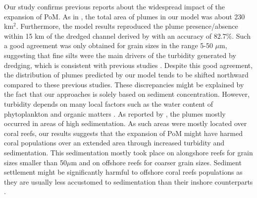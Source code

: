 \documentclass[preprint,12pt,authoryear]{elsarticle}
\begin{document}
Our study confirms previous reports about the widespread impact of the expansion of PoM. As in \cite{barnes2015sediment}, the total area of plumes in our model was about 230 km$^2$. Furthermore, the model results reproduced the plume presence/absence within 15 km of the dredged channel derived by \cite{cunning2019extensive} with an accuracy of 82.7\%. Such a good agreement was only obtained for grain sizes in the range 5-50 $\mu$m, suggesting that fine silts were the main drivers of the turbidity generated by dredging, which is consistent with previous studies \citep{storlazzi2015influence,fourney2017additive}. Despite this good agreement, the distribution of plumes predicted by our model tends to be shifted northward compared to these previous studies. These discrepancies might be explained by the fact that our approaches is solely based on sediment concentration. However, turbidity depends on many local factors such as the water content of phytoplankton and organic matters \citep{gray2000comparability,thackston2000improved}. As reported by \cite{cunning2019extensive}, the plumes mostly occurred in areas of high sedimentation. As such areas were mostly located over coral reefs, our results suggests that the expansion of PoM might have harmed coral populations over an extended area through increased turbidity and sedimentation. This sedimentation mostly took place on alongshore reefs for grain sizes smaller than 50$\mu$m and on offshore reefs for coarser grain sizes. Sediment settlement might be significantly harmful to offshore coral reefs populations as they are usually less accustomed to sedimentation than their inshore  counterparts \citep{wolanski2005fine}.
\end{document}
